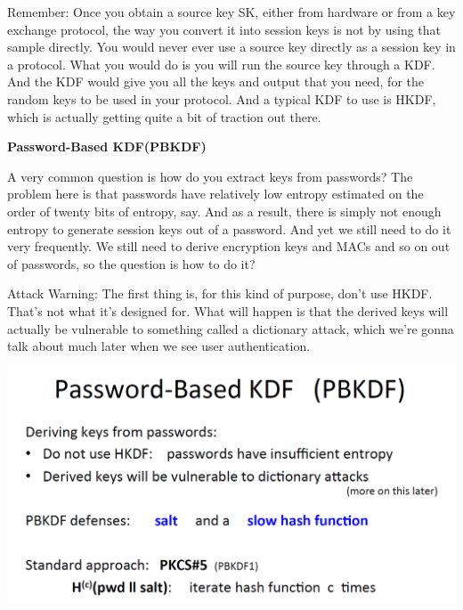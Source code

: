 \documentclass[11pt]{article}
\makeatletter
\def\maxwidth{\ifdim\Gin@nat@width>\linewidth\linewidth
    \else\Gin@nat@width\fi}
\let\Oldincludegraphics\includegraphics
\renewcommand{\includegraphics}[1]{\Oldincludegraphics[width=.8\maxwidth]{#1}}
\makeatother
\begin{document}
Remember: Once you obtain a source key SK, either from hardware or from
a key exchange protocol, the way you convert it into session keys is not
by using that sample directly. You would never ever use a source key
directly as a session key in a protocol. What you would do is you will
run the source key through a KDF. And the KDF would give you all the
keys and output that you need, for the random keys to be used in your
protocol. And a typical KDF to use is HKDF, which is actually getting
quite a bit of traction out there.

\textbf{Password-Based KDF(PBKDF)}

A very common question is how do you extract keys from passwords? The
problem here is that passwords have relatively low entropy estimated on
the order of twenty bits of entropy, say. And as a result, there is
simply not enough entropy to generate session keys out of a password.
And yet we still need to do it very frequently. We still need to derive
encryption keys and MACs and so on out of passwords, so the question is
how to do it?

Attack Warning: The first thing is, for this kind of purpose, don't use
HKDF. That's not what it's designed for. What will happen is that the
derived keys will actually be vulnerable to something called a
dictionary attack, which we're gonna talk about much later when we see
user authentication.

\includegraphics{./Images/PBKDF.png}
\end{document}
